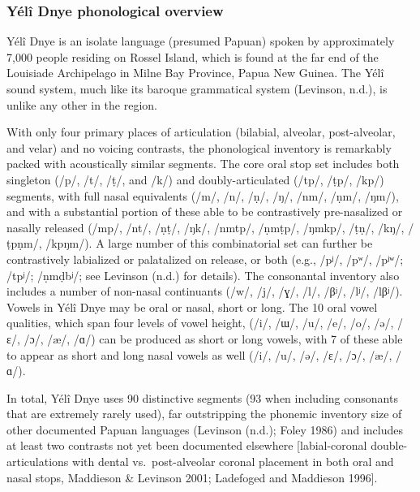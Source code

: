 \documentclass[english,,man,floatsintext]{apa6}
\begin{document}
\hypertarget{yuxe9luxee-dnye-phonological-overview}{%
\subsubsection{Yélî Dnye phonological overview}\label{yuxe9luxee-dnye-phonological-overview}}

Yélî Dnye is an isolate language (presumed Papuan) spoken by approximately 7,000 people residing on Rossel Island, which is found at the far end of the Louisiade Archipelago in Milne Bay Province, Papua New Guinea. The Yélî sound system, much like its baroque grammatical system (Levinson, n.d.), is unlike any other in the region.

With only four primary places of articulation (bilabial, alveolar, post-alveolar, and velar) and no voicing contrasts, the phonological inventory is remarkably packed with acoustically similar segments. The core oral stop set includes both singleton (/p/, /t/, /ṭ/, and /k/) and doubly-articulated (/tp/, /ṭp/, /kp/) segments, with full nasal equivalents (/m/, /n/, /ṇ/, /ŋ/, /nm/, /ṇm/, /ŋm/), and with a substantial portion of these able to be contrastively pre-nasalized or nasally released (/mp/, /nt/, /ṇṭ/, /ŋk/, /nmtp/, /ṇmṭp/, /ŋmkp/, /ṭṇ/, /kŋ/, /ṭpṇm/, /kpŋm/). A large number of this combinatorial set can further be contrastively labialized or palatalized on release, or both (e.g., /pʲ/, /pʷ/, /pʲʷ/; /tpʲ/; /ṇmḍbʲ/; see Levinson (n.d.) for details). The consonantal inventory also includes a number of non-nasal continuants (/w/, /j/, /ɣ/, /l/, /βʲ/, /lʲ/, /lβʲ/). Vowels in Yélî Dnye may be oral or nasal, short or long. The 10 oral vowel qualities, which span four levels of vowel height, (/i/, /ɯ/, /u/, /e/, /o/, /ə/, /ɛ/, /ɔ/, /æ/, /ɑ/) can be produced as short or long vowels, with 7 of these able to appear as short and long nasal vowels as well (/i/, /u/, /ə/, /ɛ/, /ɔ/, /æ/, /ɑ/).

In total, Yélî Dnye uses 90 distinctive segments (93 when including consonants that are extremely rarely used), far outstripping the phonemic inventory size of other documented Papuan languages (Levinson (n.d.); Foley 1986) and includes at least two contrasts not yet been documented elsewhere {[}labial-coronal double-articulations with dental vs.~post-alveolar coronal placement in both oral and nasal stops, Maddieson \& Levinson 2001; Ladefoged and Maddieson 1996{]}.
\end{document}
